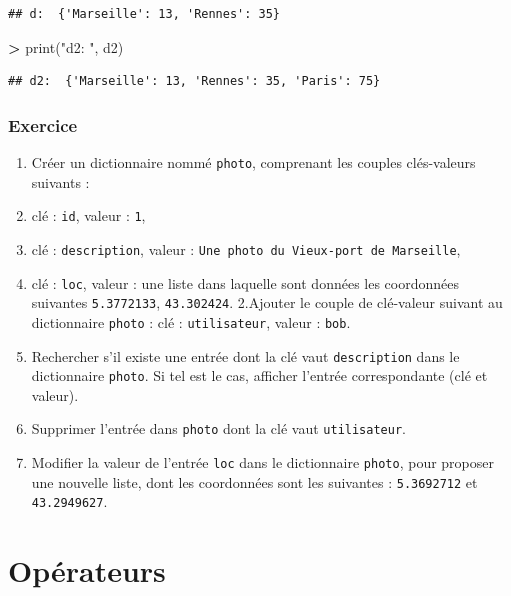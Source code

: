 \documentclass[12pt,]{book}
\newenvironment{Shaded}{\begin{snugshade}}{\end{snugshade}}
\newcommand{\StringTok}[1]{\textcolor[rgb]{0.31,0.60,0.02}{#1}}
\newcommand{\OperatorTok}[1]{\textcolor[rgb]{0.81,0.36,0.00}{\textbf{#1}}}
\newcommand{\BuiltInTok}[1]{#1}
\newcommand{\NormalTok}[1]{#1}
\providecommand{\tightlist}{%
  \setlength{\itemsep}{0pt}\setlength{\parskip}{0pt}}
\numberwithin{equation}{section}
\numberwithin{countremarque}{section}
\let\BeginKnitrBlock\begin \let\EndKnitrBlock\end
\begin{document}
\begin{lstlisting}
## d:  {'Marseille': 13, 'Rennes': 35}
\end{lstlisting}

\begin{Shaded}
\begin{Highlighting}[]
\OperatorTok{>} \BuiltInTok{print}\NormalTok{(}\StringTok{"d2: "}\NormalTok{, d2)}
\end{Highlighting}
\end{Shaded}

\begin{lstlisting}
## d2:  {'Marseille': 13, 'Rennes': 35, 'Paris': 75}
\end{lstlisting}

\subsection{Exercice}\label{exercice-1}

\BeginKnitrBlock{exframe}
\begin{enumerate}
\def\labelenumi{\arabic{enumi}.}
\tightlist
\item
  Créer un dictionnaire nommé \texttt{photo}, comprenant les couples
  clés-valeurs suivants :
\item
  clé : \texttt{id}, valeur : \texttt{1},
\item
  clé : \texttt{description}, valeur :
  \texttt{Une\ photo\ du\ Vieux-port\ de\ Marseille},
\item
  clé : \texttt{loc}, valeur : une liste dans laquelle sont données les
  coordonnées suivantes \texttt{5.3772133}, \texttt{43.302424}.
  2.Ajouter le couple de clé-valeur suivant au dictionnaire
  \texttt{photo} : clé : \texttt{utilisateur}, valeur : \texttt{bob}.
\item
  Rechercher s'il existe une entrée dont la clé vaut
  \texttt{description} dans le dictionnaire \texttt{photo}. Si tel est
  le cas, afficher l'entrée correspondante (clé et valeur).
\item
  Supprimer l'entrée dans \texttt{photo} dont la clé vaut
  \texttt{utilisateur}.
\item
  Modifier la valeur de l'entrée \texttt{loc} dans le dictionnaire
  \texttt{photo}, pour proposer une nouvelle liste, dont les coordonnées
  sont les suivantes : \texttt{5.3692712} et \texttt{43.2949627}.
\end{enumerate}
\EndKnitrBlock{exframe}

\chapter{Opérateurs}\label{operateurs}
\end{document}
